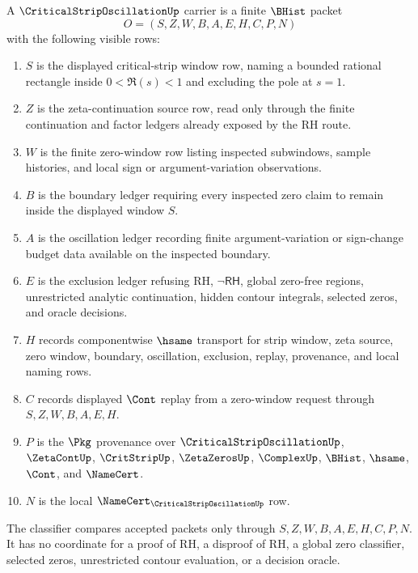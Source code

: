 \begin{definition}
\label{def:critical-strip-oscillation-carrier}
A $\CriticalStripOscillationUp$ carrier is a finite $\BHist$ packet
$$
O=(S,Z,W,B,A,E,H,C,P,N)
$$
with the following visible rows:
\begin{enumerate}
\item $S$ is the displayed critical-strip window row, naming a bounded rational rectangle inside $0<\Re(s)<1$ and excluding the pole at $s=1$.
\item $Z$ is the zeta-continuation source row, read only through the finite continuation and factor ledgers already exposed by the RH route.
\item $W$ is the finite zero-window row listing inspected subwindows, sample histories, and local sign or argument-variation observations.
\item $B$ is the boundary ledger requiring every inspected zero claim to remain inside the displayed window $S$.
\item $A$ is the oscillation ledger recording finite argument-variation or sign-change budget data available on the inspected boundary.
\item $E$ is the exclusion ledger refusing RH, $\neg\mathsf{RH}$, global zero-free regions, unrestricted analytic continuation, hidden contour integrals, selected zeros, and oracle decisions.
\item $H$ records componentwise $\hsame$ transport for strip window, zeta source, zero window, boundary, oscillation, exclusion, replay, provenance, and local naming rows.
\item $C$ records displayed $\Cont$ replay from a zero-window request through $S,Z,W,B,A,E,H$.
\item $P$ is the $\Pkg$ provenance over $\CriticalStripOscillationUp$, $\ZetaContUp$, $\CritStripUp$, $\ZetaZerosUp$, $\ComplexUp$, $\BHist$, $\hsame$, $\Cont$, and $\NameCert$.
\item $N$ is the local $\NameCert_{\CriticalStripOscillationUp}$ row.
\end{enumerate}
The classifier compares accepted packets only through $S,Z,W,B,A,E,H,C,P,N$. It has no coordinate for a proof of RH, a disproof of RH, a global zero classifier, selected zeros, unrestricted contour evaluation, or a decision oracle.
\end{definition}

